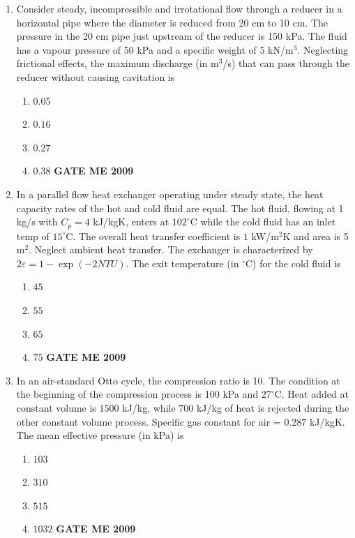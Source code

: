 \documentclass[journal]{IEEEtran}
\begin{document}
\begin{enumerate}[leftmargin=0pt]
\item Consider steady, incompressible and irrotational flow through a reducer in a horizontal pipe where the diameter is reduced from 20 cm to 10 cm. The pressure in the 20 cm pipe just upstream of the reducer is 150 kPa. The fluid has a vapour pressure of 50 kPa and a specific weight of 5 kN/m$^3$. Neglecting frictional effects, the maximum discharge (in m$^3$/s) that can pass through the reducer without causing cavitation is
\begin{enumerate}[label=(\Alph*)]
  \item $0.05$
  \item $0.16$
  \item $0.27$
  \item $0.38$
\hfill{\textbf{GATE ME 2009}}
\end{enumerate}

\item In a parallel flow heat exchanger operating under steady state, the heat capacity rates of the hot and cold fluid are equal. The hot fluid, flowing at 1 kg/s with $C_p = 4$ kJ/kgK, enters at $102^\circ$C while the cold fluid has an inlet temp of $15^\circ$C. The overall heat transfer coefficient is $1$ kW/m$^2$K and area is 5 m$^2$. Neglect ambient heat transfer. The exchanger is characterized by $2\varepsilon = 1 - \exp(-2 NTU)$. The exit temperature (in $^\circ$C) for the cold fluid is
\begin{enumerate}[label=(\Alph*)]
  \item $45$
  \item $55$
  \item $65$
  \item $75$
\hfill{\textbf{GATE ME 2009}}
\end{enumerate}

\item In an air-standard Otto cycle, the compression ratio is 10. The condition at the beginning of the compression process is 100 kPa and $27^\circ$C. Heat added at constant volume is $1500$ kJ/kg, while $700$ kJ/kg of heat is rejected during the other constant volume process. Specific gas constant for air = $0.287$ kJ/kgK. The mean effective pressure (in kPa) is
\begin{enumerate}[label=(\Alph*)]
  \item $103$
  \item $310$
  \item $515$
  \item $1032$
\hfill{\textbf{GATE ME 2009}}
\end{enumerate}


\end{enumerate}
\end{document}
